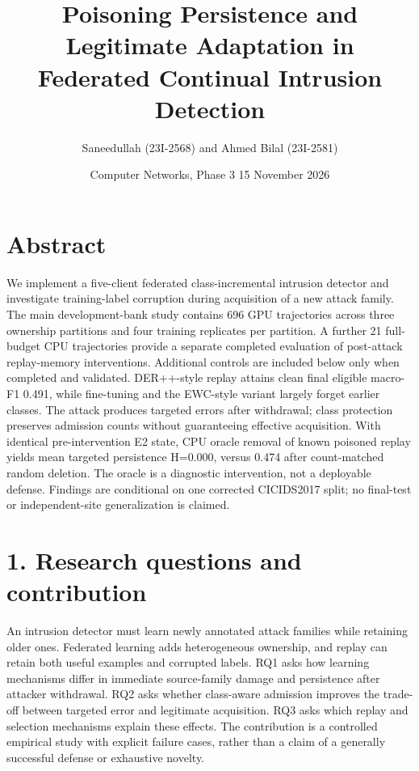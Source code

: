 \documentclass[
  10pt,
  a4paper,
]{article}
\title{Poisoning Persistence and Legitimate Adaptation in Federated
Continual Intrusion Detection}
\author{Saneedullah (23I-2568) and Ahmed Bilal (23I-2581)}
\date{Computer Networks, Phase 3 \textbar{} 15 November 2026}
\begin{document}
\maketitle

\hypertarget{abstract}{%
\section{Abstract}\label{abstract}}

We implement a five-client federated class-incremental intrusion
detector and investigate training-label corruption during acquisition of
a new attack family. The main development-bank study contains 696 GPU
trajectories across three ownership partitions and four training
replicates per partition. A further 21 full-budget CPU trajectories
provide a separate completed evaluation of post-attack replay-memory
interventions. Additional controls are included below only when
completed and validated. DER++-style replay attains clean final eligible
macro-F1 0.491, while fine-tuning and the EWC-style variant largely
forget earlier classes. The attack produces targeted errors after
withdrawal; class protection preserves admission counts without
guaranteeing effective acquisition. With identical pre-intervention E2
state, CPU oracle removal of known poisoned replay yields mean targeted
persistence H=0.000, versus 0.474 after count-matched random deletion.
The oracle is a diagnostic intervention, not a deployable defense.
Findings are conditional on one corrected CICIDS2017 split; no
final-test or independent-site generalization is claimed.

\hypertarget{research-questions-and-contribution}{%
\section{1. Research questions and
contribution}\label{research-questions-and-contribution}}

An intrusion detector must learn newly annotated attack families while
retaining older ones. Federated learning adds heterogeneous ownership,
and replay can retain both useful examples and corrupted labels. RQ1
asks how learning mechanisms differ in immediate source-family damage
and persistence after attacker withdrawal. RQ2 asks whether class-aware
admission improves the trade-off between targeted error and legitimate
acquisition. RQ3 asks which replay and selection mechanisms explain
these effects. The contribution is a controlled empirical study with
explicit failure cases, rather than a claim of a generally successful
defense or exhaustive novelty.
\end{document}
